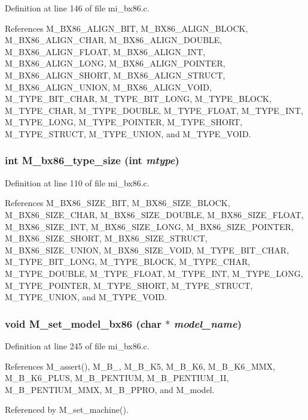 Definition at line 146 of file mi\_\-bx86.c.

References M\_\-BX86\_\-ALIGN\_\-BIT, M\_\-BX86\_\-ALIGN\_\-BLOCK, M\_\-BX86\_\-ALIGN\_\-CHAR, M\_\-BX86\_\-ALIGN\_\-DOUBLE, M\_\-BX86\_\-ALIGN\_\-FLOAT, M\_\-BX86\_\-ALIGN\_\-INT, M\_\-BX86\_\-ALIGN\_\-LONG, M\_\-BX86\_\-ALIGN\_\-POINTER, M\_\-BX86\_\-ALIGN\_\-SHORT, M\_\-BX86\_\-ALIGN\_\-STRUCT, M\_\-BX86\_\-ALIGN\_\-UNION, M\_\-BX86\_\-ALIGN\_\-VOID, M\_\-TYPE\_\-BIT\_\-CHAR, M\_\-TYPE\_\-BIT\_\-LONG, M\_\-TYPE\_\-BLOCK, M\_\-TYPE\_\-CHAR, M\_\-TYPE\_\-DOUBLE, M\_\-TYPE\_\-FLOAT, M\_\-TYPE\_\-INT, M\_\-TYPE\_\-LONG, M\_\-TYPE\_\-POINTER, M\_\-TYPE\_\-SHORT, M\_\-TYPE\_\-STRUCT, M\_\-TYPE\_\-UNION, and M\_\-TYPE\_\-VOID.
\subsubsection{\setlength{\rightskip}{0pt plus 5cm}int M\_\-bx86\_\-type\_\-size (int {\em mtype})}\label{mi__bx86_8c_345cff019da2f33d628513a7b5c0115f}




Definition at line 110 of file mi\_\-bx86.c.

References M\_\-BX86\_\-SIZE\_\-BIT, M\_\-BX86\_\-SIZE\_\-BLOCK, M\_\-BX86\_\-SIZE\_\-CHAR, M\_\-BX86\_\-SIZE\_\-DOUBLE, M\_\-BX86\_\-SIZE\_\-FLOAT, M\_\-BX86\_\-SIZE\_\-INT, M\_\-BX86\_\-SIZE\_\-LONG, M\_\-BX86\_\-SIZE\_\-POINTER, M\_\-BX86\_\-SIZE\_\-SHORT, M\_\-BX86\_\-SIZE\_\-STRUCT, M\_\-BX86\_\-SIZE\_\-UNION, M\_\-BX86\_\-SIZE\_\-VOID, M\_\-TYPE\_\-BIT\_\-CHAR, M\_\-TYPE\_\-BIT\_\-LONG, M\_\-TYPE\_\-BLOCK, M\_\-TYPE\_\-CHAR, M\_\-TYPE\_\-DOUBLE, M\_\-TYPE\_\-FLOAT, M\_\-TYPE\_\-INT, M\_\-TYPE\_\-LONG, M\_\-TYPE\_\-POINTER, M\_\-TYPE\_\-SHORT, M\_\-TYPE\_\-STRUCT, M\_\-TYPE\_\-UNION, and M\_\-TYPE\_\-VOID.
\subsubsection{\setlength{\rightskip}{0pt plus 5cm}void M\_\-set\_\-model\_\-bx86 (char $\ast$ {\em model\_\-name})}\label{mi__bx86_8c_e7640e6dc2ce31d051f35a6aa4c1371c}




Definition at line 245 of file mi\_\-bx86.c.

References M\_\-assert(), M\_\-B\_, M\_\-B\_\-K5, M\_\-B\_\-K6, M\_\-B\_\-K6\_\-MMX, M\_\-B\_\-K6\_\-PLUS, M\_\-B\_\-PENTIUM, M\_\-B\_\-PENTIUM\_\-II, M\_\-B\_\-PENTIUM\_\-MMX, M\_\-B\_\-PPRO, and M\_\-model.

Referenced by M\_\-set\_\-machine().